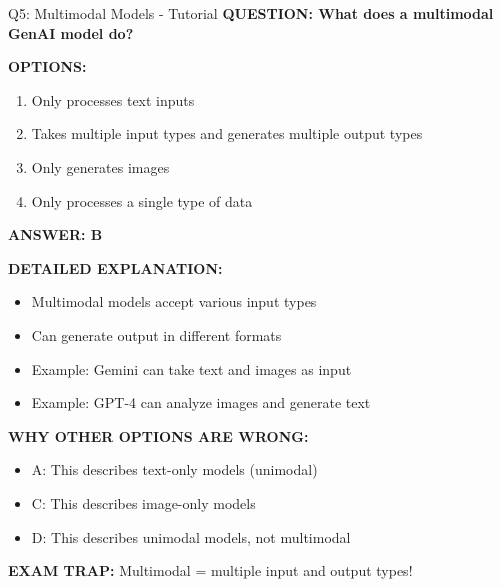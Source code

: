 \documentclass[8pt]{beamer}
\begin{document}
	\begin{frame}{Q5: Multimodal Models - Tutorial}
		\fontsize{6.5}{7.5}\selectfont
		\textbf{QUESTION: What does a multimodal GenAI model do?}
		
		\vspace{0.1cm}
		\textbf{OPTIONS:}
		\begin{enumerate}
			\item Only processes text inputs
			\item Takes multiple input types and generates multiple output types
			\item Only generates images
			\item Only processes a single type of data
		\end{enumerate}
		
		\vspace{0.1cm}
		\textcolor{myblue}{\textbf{ANSWER: B}}
		
		\vspace{0.1cm}
		\textbf{DETAILED EXPLANATION:}
		\begin{itemize}
			\item Multimodal models accept various input types
			\item Can generate output in different formats
			\item Example: Gemini can take text and images as input
			\item Example: GPT-4 can analyze images and generate text
		\end{itemize}
		
		\vspace{0.1cm}
		\textcolor{myred}{\textbf{WHY OTHER OPTIONS ARE WRONG:}}
		\begin{itemize}
			\item \textcolor{myred}{A:} This describes text-only models (unimodal)
			\item \textcolor{myred}{C:} This describes image-only models
			\item \textcolor{myred}{D:} This describes unimodal models, not multimodal
		\end{itemize}
		
		\textcolor{myred}{\textbf{EXAM TRAP:}} Multimodal = \textcolor{myblue}{multiple input and output types}!
	\end{frame}
	
\end{document}
